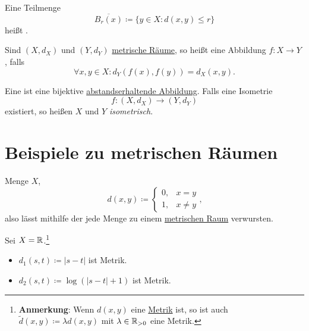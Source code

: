\begin{definition}
  \label{def:abgeschlossenerBall}
  Eine Teilmenge
  \begin{equation*}
    \overline{B_r(x)} \coloneqq \{ y \in X : d(x,y) \leq r \}
  \end{equation*}
  heißt .
\end{definition}

\begin{definition}
  \label{def:abstandserhaltendeAbbildung}
  Sind $ (X, d_X) $ und $ (Y, d_Y) $ \hyperref[def:metrischerRaum]{metrische Räume}, so heißt eine Abbildung $ f: X \to Y $ , falls
  \begin{equation*}
    \forall x, y \in X: d_Y(f(x), f(y)) = d_X(x, y)\text{.}
  \end{equation*}
\end{definition}

\begin{definition}[Isometrie] 
  \label{def:isometrie}
  Eine  ist eine bijektive \hyperref[def:abstandserhaltendeAbbildung]{abstandserhaltende Abbildung}. Falls eine Isometrie
  \begin{equation*}
    f: (X, d_X) \to (Y, d_Y)
  \end{equation*}
  existiert, so heißen $ X $ und $ Y $ \emph{isometrisch}.
\end{definition}

\section{Beispiele zu metrischen Räumen}

\begin{example}
  \label{bsp:trivialeMetrik}
  Menge $ X $,
  \begin{equation*}
    d(x, y) \coloneqq \begin{cases}
    0, &x = y \\
    1, & x \neq y
  \end{cases}\text{,}
  \end{equation*}
  also lässt mithilfe der  jede Menge zu einem \hyperref[def:metrischerRaum]{metrischen Raum} verwursten. 
\end{example}

\clearpage

\begin{example}
  \label{bsp:simpleMetriken}
  Sei $ X = \mathbb{R} $.\footnote{\textbf{Anmerkung}: Wenn $ d(x, y) $ eine \hyperref[def:metrik]{Metrik} ist, so ist auch $ \widetilde{d}(x, y) \coloneqq \lambda d(x, y) $ mit $ \lambda \in \mathbb{R}_{>0} $ eine Metrik.}
  \begin{itemize}
    \item $ d_1(s, t) \coloneqq |s-t| $ ist Metrik.
    \item $ d_2(s, t) \coloneqq \log(|s-t|+1) $ ist Metrik.
  \end{itemize}
\end{example}

